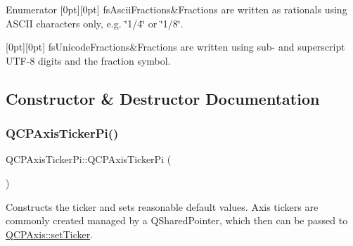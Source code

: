 \begin{DoxyEnumFields}{Enumerator}
[0pt][0pt]{}\mbox{\label{class_q_c_p_axis_ticker_pi_a262f1534c7f0c79a7d5237f5d1e2c54ca6fac514410866c5f9cb7917dbe12345a}} 
fs\+Ascii\+Fractions&Fractions are written as rationals using A\+S\+C\+II characters only, e.\+g. \char`\"{}1/4\char`\"{} or \char`\"{}1/8\char`\"{}. \\
\hline

[0pt][0pt]{}\mbox{\label{class_q_c_p_axis_ticker_pi_a262f1534c7f0c79a7d5237f5d1e2c54cae110eb223e71eb94792ea75eb1748826}} 
fs\+Unicode\+Fractions&Fractions are written using sub-\/ and superscript U\+T\+F-\/8 digits and the fraction symbol. \\
\hline

\end{DoxyEnumFields}


\subsection{Constructor \& Destructor Documentation}
\mbox{\label{class_q_c_p_axis_ticker_pi_aa0d7b7034055927c0f0077a2d713d7d0}} 
\subsubsection{\texorpdfstring{Q\+C\+P\+Axis\+Ticker\+Pi()}{QCPAxisTickerPi()}}
{\footnotesize\ttfamily Q\+C\+P\+Axis\+Ticker\+Pi\+::\+Q\+C\+P\+Axis\+Ticker\+Pi (\begin{DoxyParamCaption}{ }\end{DoxyParamCaption})}

Constructs the ticker and sets reasonable default values. Axis tickers are commonly created managed by a Q\+Shared\+Pointer, which then can be passed to \hyperlink{class_q_c_p_axis_a4ee03fcd2c74d05cd1a419b9af5cfbdc}{Q\+C\+P\+Axis\+::set\+Ticker}. 

